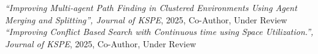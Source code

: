 \noindent
\small\textit{“Improving Multi-agent Path Finding in Clustered Environments Using Agent Merging and Splitting”, Journal of KSPE}, 2025, Co-Author, Under Review \\[0.3em]
\small\textit{“Improving Conflict Based Search with Continuous time using Space Utilization.”, Journal of KSPE}, 2025, Co-Author, Under Review